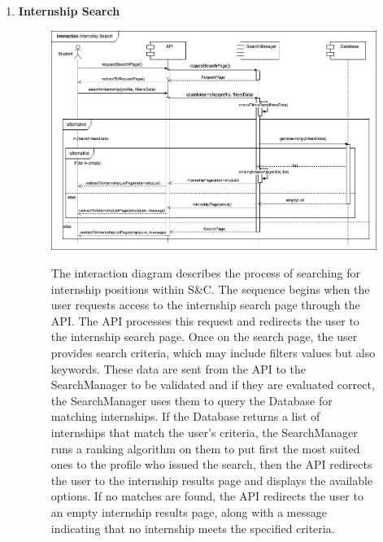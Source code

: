 \begin{enumerate}
    \newpage
    \item \textbf{Internship Search}
    \begin{figure}[h!]
            \centering  \includegraphics[width=1\textwidth]{DD/Images/Interactions/INT05_InternshipSearch.drawio.png}
            \label{fig:ComponentViewDiagram}
            \caption*{The interaction diagram describes the process of searching for internship positions within S\&C. The sequence begins when the user requests access to the internship search page through the API. The API processes this request and redirects the user to the internship search page. Once on the search page, the user provides search criteria, which may include filters values but also keywords. These data are sent from the API to the SearchManager to be validated and if they are evaluated correct, the SearchManager uses them to query the Database for matching internships. If the Database returns a list of internships that match the user's criteria, the SearchManager runs a ranking algorithm on them to put first the most suited ones to the profile who issued the search, then the API redirects the user to the internship results page and displays the available options. If no matches are found, the API redirects the user to an empty internship results page, along with a message indicating that no internship meets the specified criteria. 
            }
    \end{figure}


\end{enumerate}

